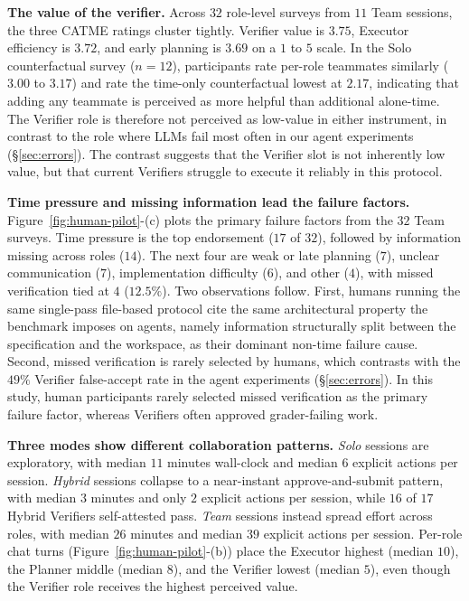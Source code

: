 \documentclass{article}
\begin{document}
\textbf{The value of the verifier.} Across $32$ role-level surveys from $11$ Team sessions, the three CATME \citep{o2024objective} ratings cluster tightly. Verifier value is $3.75$, Executor efficiency is $3.72$, and early planning is $3.69$ on a $1$ to $5$ scale. In the Solo counterfactual survey ($n=12$), participants rate per-role teammates similarly ($3.00$ to $3.17$) and rate the time-only counterfactual lowest at $2.17$, indicating that adding any teammate is perceived as more helpful than additional alone-time. The Verifier role is therefore not perceived as low-value in either instrument, in contrast to the role where LLMs fail most often in our agent experiments (\S\ref{sec:errors}). The contrast suggests that the Verifier slot is not inherently low value, but that current Verifiers struggle to execute it reliably in this protocol.

\textbf{Time pressure and missing information lead the failure factors.} Figure~\ref{fig:human-pilot}-(c) plots the primary failure factors from the $32$ Team surveys. Time pressure is the top endorsement ($17$ of $32$), followed by information missing across roles ($14$). The next four are weak or late planning ($7$), unclear communication ($7$), implementation difficulty ($6$), and other ($4$), with missed verification tied at $4$ ($12.5\%$). Two observations follow. First, humans running the same single-pass file-based protocol cite the same architectural property the benchmark imposes on agents, namely information structurally split between the specification and the workspace, as their dominant non-time failure cause. Second, missed verification is rarely selected by humans, which contrasts with the $49\%$ Verifier false-accept rate in the agent experiments (\S\ref{sec:errors}). In this study, human participants rarely selected missed verification as the primary failure factor, whereas Verifiers often approved grader-failing work.

\textbf{Three modes show different collaboration patterns.} \emph{Solo} sessions are exploratory, with median $11$ minutes wall-clock and median $6$ explicit actions per session. \emph{Hybrid} sessions collapse to a near-instant approve-and-submit pattern, with median $3$ minutes and only $2$ explicit actions per session, while $16$ of $17$ Hybrid Verifiers self-attested pass. \emph{Team} sessions instead spread effort across roles, with median $26$ minutes and median $39$ explicit actions per session. Per-role chat turns (Figure~\ref{fig:human-pilot}-(b)) place the Executor highest (median $10$), the Planner middle (median $8$), and the Verifier lowest (median $5$), even though the Verifier role receives the highest perceived value.
\end{document}
